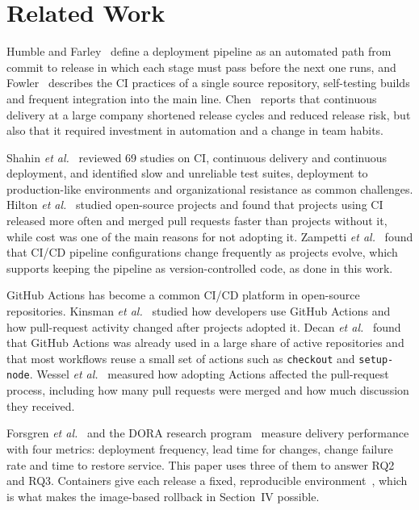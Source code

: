 \documentclass[conference]{IEEEtran}
\begin{document}
\section{Related Work}
Humble and Farley~\cite{humble2010} define a deployment pipeline as an automated path from commit to release in which each stage must pass before the next one runs, and Fowler~\cite{fowler2006} describes the CI practices of a single source repository, self-testing builds and frequent integration into the main line. Chen~\cite{chen2015} reports that continuous delivery at a large company shortened release cycles and reduced release risk, but also that it required investment in automation and a change in team habits.

Shahin \textit{et al.}~\cite{shahin2017} reviewed 69 studies on CI, continuous delivery and continuous deployment, and identified slow and unreliable test suites, deployment to production-like environments and organizational resistance as common challenges. Hilton \textit{et al.}~\cite{hilton2016} studied open-source projects and found that projects using CI released more often and merged pull requests faster than projects without it, while cost was one of the main reasons for not adopting it. Zampetti \textit{et al.}~\cite{zampetti2021} found that CI/CD pipeline configurations change frequently as projects evolve, which supports keeping the pipeline as version-controlled code, as done in this work.

GitHub Actions has become a common CI/CD platform in open-source repositories. Kinsman \textit{et al.}~\cite{kinsman2021} studied how developers use GitHub Actions and how pull-request activity changed after projects adopted it. Decan \textit{et al.}~\cite{decan2022} found that GitHub Actions was already used in a large share of active repositories and that most workflows reuse a small set of actions such as \texttt{checkout} and \texttt{setup-node}. Wessel \textit{et al.}~\cite{wessel2023} measured how adopting Actions affected the pull-request process, including how many pull requests were merged and how much discussion they received.

Forsgren \textit{et al.}~\cite{forsgren2018} and the DORA research program~\cite{dora2024} measure delivery performance with four metrics: deployment frequency, lead time for changes, change failure rate and time to restore service. This paper uses three of them to answer RQ2 and RQ3. Containers give each release a fixed, reproducible environment~\cite{merkel2014}, which is what makes the image-based rollback in Section~IV possible.
\end{document}
